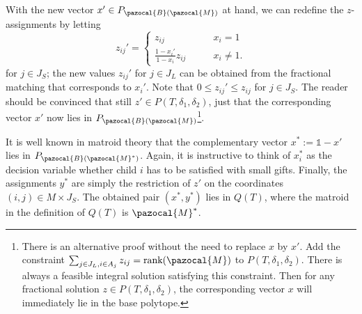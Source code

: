 
With the new vector $x' \in P_{\pazocal{B}(\pazocal{M})}$ at hand, we can redefine the $z$-assignments by letting
\[ 
  z_{ij}' = 
\begin{cases}
z_{ij} & \qquad x_i = 1\\ 
\frac{1-x_i'}{1-x_i} z_{ij} & \qquad x_i \neq 1.
\end{cases} 
\]
for $j \in J_S$; the new values $z_{ij}'$ for $j \in J_L$ can be obtained from the fractional matching
that corresponds to $x_i'$. Note that $0 \leq z_{ij}' \leq z_{ij}$ for $j \in J_S$. The reader should be convinced that
still $z' \in P(T,\delta_1,\delta_2)$, just that the corresponding vector $x'$ now lies in $P_{\pazocal{B}(\pazocal{M})}$\footnote{There is an alternative proof without the need to replace $x$ by $x'$. Add the constraint $\sum_{j \in J_L, i \in A_j} z_{ij} = \textrm{rank}(\pazocal{M})$
to $P(T,\delta_1, \delta_2)$. There is always a feasible integral solution satisfying this constraint. Then for any fractional solution $z \in P(T,\delta_1,\delta_2)$, the corresponding vector $x$ will immediately lie in the base polytope.}.


It is well known in matroid theory that  
the complementary vector $x^* := \mathbb{1} - x'$ lies in $P_{\pazocal{B}(\pazocal{M}^*)}$. 
Again, it is instructive to think of $x^*_i$ as the decision variable whether 
child $i$ has to be satisfied with small gifts.
Finally, the assignments $y^*$ are simply the restriction of $z'$ on the 
coordinates $(i,j) \in M \times J_S$.
The obtained pair $(x^*,y^*)$ lies in $Q(T)$, where the matroid in the definition 
of $Q(T)$ is $\pazocal{M}^*$.




